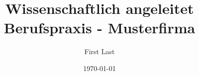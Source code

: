 %
%

\newcommand{\fullname}{First Last}
\newcommand{\email}{first.last@stud-provadis-hochschule.de}
\newcommand{\matnr}{XXXX}
\newcommand{\telMobil}{+49 XXX XXXXXXX}
\newcommand{\fakultaet}{Informatik und Wirtschaftsinformatik}

\newcommand{\titel}{Textvorlage für wissenschaftliche Arbeiten\\
	Titel und Untertitel der Arbeit}
\newcommand{\unternehmen}{Musterfirma}

\newcommand{\abgabedatum}{XX.XX.XXXX}

\newcommand{\refFirst}{Prof. Dr. First Last}
\newcommand{\refSecond}{Prof. Dr. First Last}

\title{Wissenschaftlich angeleitet Berufspraxis - \unternehmen}
\author{\fullname}
\date{\today}